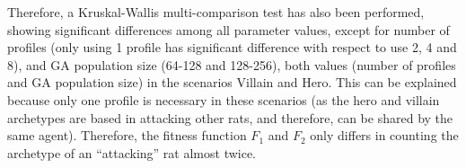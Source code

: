 \documentclass[runningheads,a4paper]{llncs}
\begin{document}
Therefore, a Kruskal-Wallis multi-comparison test has also been
performed, showing significant differences among all parameter values,
except for number of profiles (only using 1 profile has significant
difference with respect to use 2, 4 and 8), and GA population size
(64-128 and 128-256), both values (number of profiles and GA population size) in the scenarios Villain and Hero. This
can be explained because only one profile is necessary in these
scenarios (as the hero and villain archetypes are based in attacking
other rats, and therefore, can be shared by the same agent). Therefore, 
the fitness function $F_1$ and $F_2$ only differs in counting the archetype of an ``attacking'' rat almost twice.  %
\end{document}
